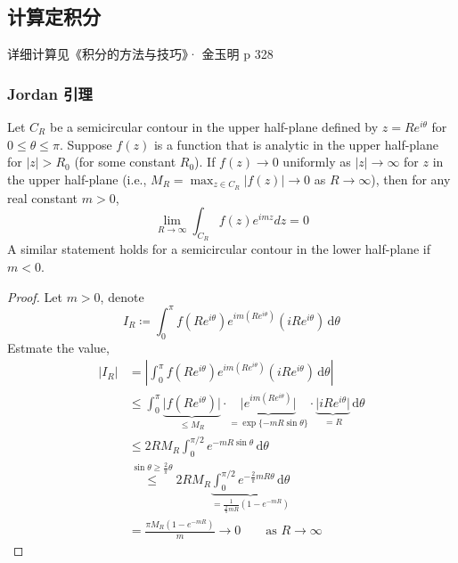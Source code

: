 \subsection{计算定积分}

详细计算见《积分的方法与技巧》· 金玉明 p 328

\label{jflajlf}

\subsubsection{Jordan 引理}

\begin{lemma}
Let $C_R$ be a semicircular contour in the upper half-plane defined by $z = Re^{i\theta}$ for $0 \leq \theta \leq \pi$. Suppose $f(z)$ is a function that is analytic in the upper half-plane for $|z| > R_0$ (for some constant $R_0$).
If $f(z) \to 0$ uniformly as $|z| \to \infty$ for $z$ in the upper half-plane (i.e., $M_R = \max_{z \in C_R} |f(z)| \to 0$ as $R \to \infty$), then for any real constant $m > 0$,
\[
\lim_{R \to \infty} \int_{C_R} f(z)e^{imz} dz = 0
\]
A similar statement holds for a semicircular contour in the lower half-plane if $m < 0$.\label{3910a9}
\end{lemma}

\begin{proof}
Let $m>0$, denote
\[
I_{R}\coloneqq \int_{0}^{\pi} f(R e^{ i\theta })e^{ im(Re^{ i\theta }) }(i R e^{ i\theta }) \, \mathrm{d}\theta 
\]
Estmate the value,
\[
\begin{aligned}
\lvert I_{R} \rvert  & =\left\lvert  \int_{0}^{\pi} f(R e^{ i\theta })e^{ im(Re^{ i\theta }) }(i R e^{ i\theta }) \, \mathrm{d}\theta   \right\rvert  \\
 & \leq \int_{0}^{\pi} \underbrace{ \lvert f(R e^{ i\theta }) \rvert }_{ \leq M_{R} } \cdot \underbrace{ \lvert e^{ im(Re^{ i\theta }) } \rvert }_{ =\exp \{ -mR\sin\theta \} } \cdot \underbrace{ \lvert iR e^{ i\theta } \rvert }_{ =R }    \, \mathrm{d}\theta \\
 & \leq 2RM_{R}\int_{0}^{\pi/2 } e^{ -mR\sin\theta } \, \mathrm{d}\theta \\
 & \overset{ \sin\theta\geq  \frac{2}{\pi}\theta }{ \leq  }2RM_{R}\underbrace{ \int_{0}^{\pi/2 } e^{ -\frac{2}{\pi}mR\theta } \, \mathrm{d}\theta  }_{ =\frac{1}{\frac{2}{\pi}mR}(1-e^{ -mR }) } \\
 & =\frac{\pi M_{R}(1-e^{ -mR })}{m}\to0\qquad \text{as }R\to \infty
\end{aligned}
\]
\end{proof}

